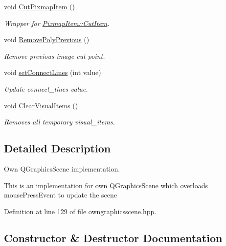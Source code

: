 \begin{DoxyCompactItemize}
void \mbox{\hyperlink{classOwnGraphicsScene_a7e3d97c27cca1df796b75cc4a99e24cd}{Cut\+Pixmap\+Item}} ()
\begin{DoxyCompactList}\small\item\em Wrapper for \mbox{\hyperlink{classPixmapItem_a4a742318dce01d018da2f4b01790c210}{Pixmap\+Item\+::\+Cut\+Item}}. \end{DoxyCompactList}\item 
void \mbox{\hyperlink{classOwnGraphicsScene_a4976a8e6f682612acd3e23b6c98bd8d8}{Remove\+Poly\+Previous}} ()
\begin{DoxyCompactList}\small\item\em Remove previous image cut point. \end{DoxyCompactList}\item 
void \mbox{\hyperlink{classOwnGraphicsScene_ad62254e1884fa4817ff1beaa3bc6c011}{set\+Connect\+Lines}} (int value)
\begin{DoxyCompactList}\small\item\em Update connect\+\_\+lines value. \end{DoxyCompactList}\item 
void \mbox{\hyperlink{classOwnGraphicsScene_a158c6430ca8e07642b693e37ec05119e}{Clear\+Visual\+Items}} ()
\begin{DoxyCompactList}\small\item\em Removes all temporary visual\+\_\+items. \end{DoxyCompactList}\end{DoxyCompactItemize}


\subsection{Detailed Description}
Own Q\+Graphics\+Scene implementation. 

This is an implementation for own Q\+Graphics\+Scene which overloads mouse\+Press\+Event to update the scene 

Definition at line 129 of file owngraphicsscene.\+hpp.



\subsection{Constructor \& Destructor Documentation}
\mbox{\label{classOwnGraphicsScene_a242b82147a469314e4c7fb5af69c265f}} 
